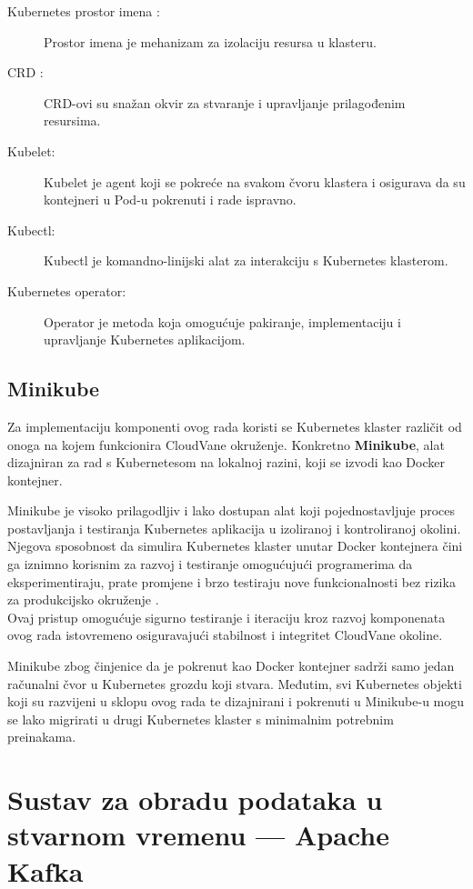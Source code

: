 \documentclass[times, utf8, diplomski]{fer}
\begin{document}
\begin{description}
	\item[Kubernetes prostor imena :] Prostor imena je mehanizam za izolaciju resursa u klasteru.
	\item[CRD :] CRD-ovi su snažan okvir za stvaranje i upravljanje prilagođenim resursima.
	\item[Kubelet:] Kubelet je agent koji se pokreće na svakom čvoru klastera i osigurava da su kontejneri u Pod-u pokrenuti i rade ispravno.
	\item[Kubectl:] Kubectl je komandno-linijski alat za interakciju s Kubernetes klasterom.
	\item[Kubernetes operator:] Operator je metoda koja omogućuje pakiranje, implementaciju i upravljanje Kubernetes aplikacijom.
\end{description}

\clearpage
\subsection{Minikube}
\label{sec:minikube}

Za implementaciju komponenti ovog rada koristi se Kubernetes klaster različit od onoga na kojem funkcionira CloudVane okruženje. Konkretno \textbf{Minikube}, alat dizajniran za rad s Kubernetesom na lokalnoj razini, koji se izvodi kao Docker kontejner.

Minikube je visoko prilagodljiv i lako dostupan alat koji pojednostavljuje proces postavljanja i testiranja Kubernetes aplikacija u izoliranoj i kontroliranoj okolini. Njegova sposobnost da simulira Kubernetes klaster unutar Docker kontejnera čini ga iznimno korisnim za razvoj i testiranje omogućujući programerima da eksperimentiraju, prate promjene i brzo testiraju nove funkcionalnosti bez rizika za produkcijsko okruženje \citep{luksa_kubernetes_2023}. \\

Ovaj pristup omogućuje sigurno testiranje i iteraciju kroz razvoj komponenata ovog rada istovremeno osiguravajući stabilnost i integritet CloudVane okoline. 

Minikube zbog činjenice da je pokrenut kao Docker kontejner sadrži samo jedan računalni čvor u Kubernetes grozdu koji stvara. Međutim, svi Kubernetes objekti koji su razvijeni u sklopu ovog rada te dizajnirani i pokrenuti u Minikube-u mogu se lako migrirati u drugi Kubernetes klaster s minimalnim potrebnim preinakama.

\clearpage
\section{Sustav za obradu podataka u stvarnom vremenu --- Apache Kafka}
\label{sec:kafka}
\end{document}

